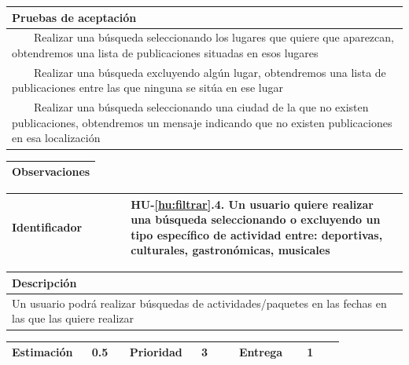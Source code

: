\documentclass[11pt]{article}
\newcommand{\tabitem}{~~\llap{\textbullet}~~}
\begin{document}
\begin{longtable}{p{1.028\linewidth}}
	\textbf{Pruebas de aceptación}\\
	\midrule
	\tabitem Realizar una búsqueda seleccionando los lugares que quiere que aparezcan, obtendremos una lista de publicaciones situadas en esos lugares\\
	\tabitem Realizar una búsqueda excluyendo algún lugar, obtendremos una lista de publicaciones entre las que ninguna se sitúa en ese lugar\\
	\tabitem Realizar una búsqueda seleccionando una ciudad de la que no existen publicaciones, obtendremos un mensaje indicando que no existen publicaciones en esa localización\\
\end{longtable}
\begin{longtable}{p{1.028\linewidth}}
	\textbf{Observaciones}\\
	\midrule
	\bottomrule
	\bottomrule
\end{longtable}

\centering
\begin{longtable}{p{0.3\linewidth}|p{0.7\linewidth}}
	\toprule
	\toprule
	\textbf{Identificador} & \textbf{HU-\ref{hu:filtrar}.4}. Un usuario quiere realizar una búsqueda seleccionando o excluyendo un tipo específico de actividad entre: deportivas, culturales, gastronómicas, musicales\\
	
	\bottomrule
\end{longtable}

\begin{longtable}{p{1.028\linewidth}}
	\textbf{Descripción}\\
	\midrule
	Un usuario podrá realizar búsquedas de actividades/paquetes en las fechas en las que las quiere realizar
\end{longtable}
\begin{longtable}{p{0.18\linewidth}|p{0.1\linewidth}|p{0.18\linewidth}|p{0.1\linewidth}|p{0.18\linewidth}|p{0.1\linewidth}}
	\toprule
	\textbf{Estimación} & 0.5 & \textbf{Prioridad} & 3 & \textbf{Entrega} & 1 \\
	\bottomrule
\end{longtable}
\end{document}

